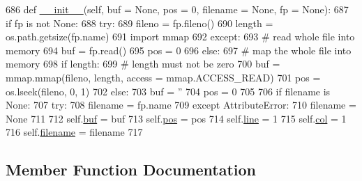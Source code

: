 \begin{DoxyCode}
686     \textcolor{keyword}{def }\hyperlink{classsmacc__viewer_1_1xdot_1_1xdot__qt_1_1Lexer_aa8397f2a53b2c598d0442515b2c2ea95}{\_\_init\_\_}(self, buf = None, pos = 0, filename = None, fp = None):
687         \textcolor{keywordflow}{if} fp \textcolor{keywordflow}{is} \textcolor{keywordflow}{not} \textcolor{keywordtype}{None}:
688             \textcolor{keywordflow}{try}:
689                 fileno = fp.fileno()
690                 length = os.path.getsize(fp.name)
691                 \textcolor{keyword}{import} mmap
692             \textcolor{keywordflow}{except}:
693                 \textcolor{comment}{# read whole file into memory}
694                 buf = fp.read()
695                 pos = 0
696             \textcolor{keywordflow}{else}:
697                 \textcolor{comment}{# map the whole file into memory}
698                 \textcolor{keywordflow}{if} length:
699                     \textcolor{comment}{# length must not be zero}
700                     buf = mmap.mmap(fileno, length, access = mmap.ACCESS\_READ)
701                     pos = os.lseek(fileno, 0, 1)
702                 \textcolor{keywordflow}{else}:
703                     buf = \textcolor{stringliteral}{''}
704                     pos = 0
705 
706             \textcolor{keywordflow}{if} filename \textcolor{keywordflow}{is} \textcolor{keywordtype}{None}:
707                 \textcolor{keywordflow}{try}:
708                     filename = fp.name
709                 \textcolor{keywordflow}{except} AttributeError:
710                     filename = \textcolor{keywordtype}{None}
711 
712         self.\hyperlink{classsmacc__viewer_1_1xdot_1_1xdot__qt_1_1Lexer_a84972711cf93f6cb82650f9f268198bf}{buf} = buf
713         self.\hyperlink{classsmacc__viewer_1_1xdot_1_1xdot__qt_1_1Lexer_a091be9759b62e2a485ea9538b429b453}{pos} = pos
714         self.\hyperlink{classsmacc__viewer_1_1xdot_1_1xdot__qt_1_1Lexer_a52906deed94ab0734201e50faf6f3c7f}{line} = 1
715         self.\hyperlink{classsmacc__viewer_1_1xdot_1_1xdot__qt_1_1Lexer_af2614106d71cab740cc0e1e1e6e349c0}{col} = 1
716         self.\hyperlink{classsmacc__viewer_1_1xdot_1_1xdot__qt_1_1Lexer_a568d66f9f2bcbf00150f2ad4889295da}{filename} = filename
717 
\end{DoxyCode}


\subsection{Member Function Documentation}

